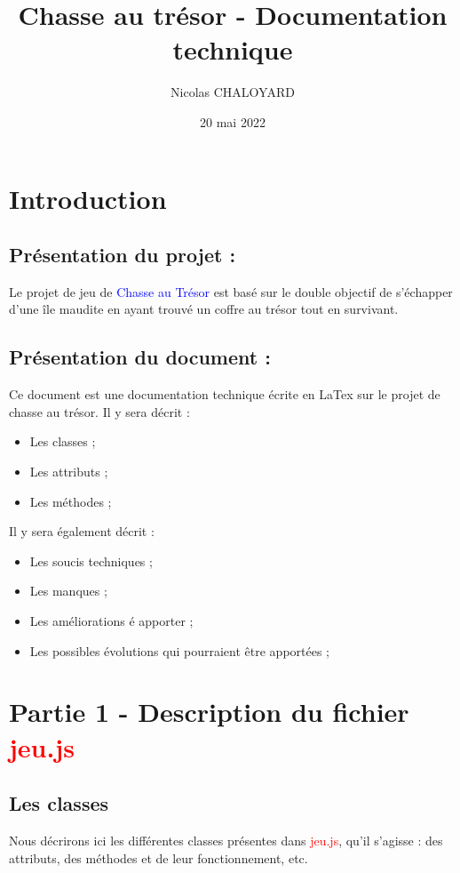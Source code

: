 \documentclass[12pt,a4paper]{report}
\title{Chasse au trésor - Documentation technique}
\author{Nicolas CHALOYARD}
\date{20 mai 2022}
\begin{document}
\maketitle
\newpage

\tableofcontents 
\newpage

\chapter{Introduction}
	\section{Présentation du projet : }
		Le projet de jeu de \textcolor{Blue}{Chasse au Trésor} est basé sur le double objectif de s'échapper d'une île maudite en ayant trouvé un coffre au trésor tout en survivant.
	\section{Présentation du document : }
		Ce document est une documentation technique écrite en LaTex sur le projet de chasse au trésor. \newline 
		Il y sera décrit : 
	   	\begin{itemize}
	   		\item Les classes ; 
	   		\item Les attributs ;
	   		\item Les méthodes ;
	   	\end{itemize}
	   	Il y sera également décrit : 
	   	\begin{itemize}
	   		\item Les soucis techniques ;
	   		\item Les manques ;
	   		\item Les améliorations é apporter ;
	   		\item Les possibles évolutions qui pourraient être apportées ; 
	   	\end{itemize}
\newpage
 	
 	\chapter{Partie 1 - Description du fichier \textcolor{red}{jeu.js}}
 		\section{Les classes}
 			Nous décrirons ici les différentes classes présentes dans \textcolor{red}{jeu.js}, qu'il s'agisse : des attributs, des méthodes et de leur fonctionnement, etc. 
\end{document}
